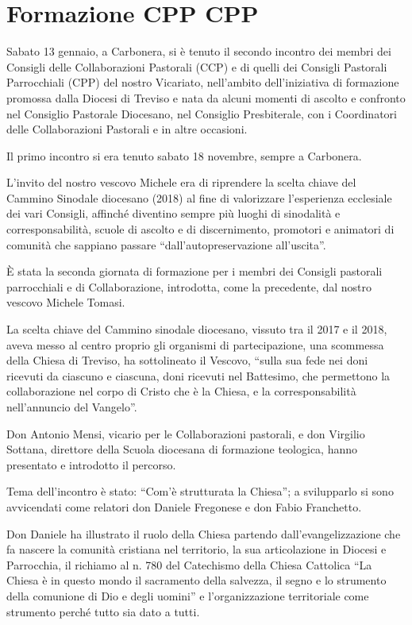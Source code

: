 \section{Formazione CPP CPP}

Sabato 13 gennaio, a Carbonera, si è tenuto il secondo incontro dei membri dei Consigli delle Collaborazioni Pastorali (CCP) e di quelli dei Consigli Pastorali Parrocchiali (CPP) del nostro Vicariato, nell’ambito dell’iniziativa di formazione promossa dalla Diocesi di Treviso e nata da alcuni momenti di ascolto e confronto nel Consiglio Pastorale Diocesano, nel Consiglio Presbiterale, con i Coordinatori delle Collaborazioni Pastorali e in altre occasioni.

Il primo incontro si era tenuto sabato 18 novembre, sempre a Carbonera.

L’invito del nostro vescovo Michele era di riprendere la scelta chiave del Cammino Sinodale diocesano (2018) al fine di valorizzare l’esperienza ecclesiale dei vari Consigli, affinché diventino sempre più luoghi di sinodalità e corresponsabilità, scuole di ascolto e di discernimento, promotori e animatori di comunità che sappiano passare “dall’autopreservazione all’uscita”.

È stata la seconda giornata di formazione per i membri dei Consigli pastorali parrocchiali e di Collaborazione, introdotta, come la precedente, dal nostro vescovo Michele Tomasi.

La scelta chiave del Cammino sinodale diocesano, vissuto tra il 2017 e il 2018, aveva messo al centro proprio gli organismi di partecipazione, una scommessa della Chiesa di Treviso, ha sottolineato il Vescovo, “sulla sua fede nei doni ricevuti da ciascuno e ciascuna, doni ricevuti nel Battesimo, che permettono la collaborazione nel corpo di Cristo che è la Chiesa, e la corresponsabilità nell’annuncio del Vangelo”.

Don Antonio Mensi, vicario per le Collaborazioni pastorali, e don Virgilio Sottana, direttore della Scuola diocesana di formazione teologica, hanno presentato e introdotto il percorso.

Tema dell’incontro è stato: “Com’è strutturata la Chiesa”; a svilupparlo si sono avvicendati come relatori don Daniele Fregonese e don Fabio Franchetto.

Don Daniele ha illustrato il ruolo della Chiesa partendo dall’evangelizzazione che fa nascere la comunità cristiana nel territorio, la sua articolazione in Diocesi e Parrocchia, il richiamo al n. 780 del Catechismo della Chiesa Cattolica “La Chiesa è in questo mondo il sacramento della salvezza, il segno e lo strumento della comunione di Dio e degli uomini” e l’organizzazione territoriale come strumento perché tutto sia dato a tutti.

